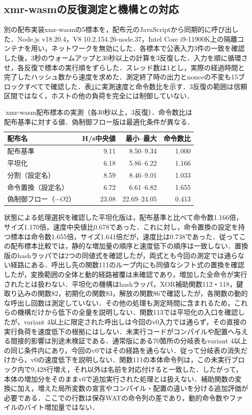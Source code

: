 \documentclass[submit,techrep]{ipsj}
\begin{document}
\subsection{xmr-wasmの反復測定と機構との対応}
\label{sec:xmr-runtime}
別の配布実装xmr-wasmの5標本を，配布元のJavaScriptから同期的に呼び出した．Node.js v18.20.4，V8 10.2.154.26-node.37，Intel Core i9-11900K上の隔離コンテナを用い，ネットワークを無効にした．各標本で公表入力3件の一致を確認した後，3秒のウォームアップと30秒以上の計算を3反復した．入力を順に循環させ，各反復で標本の実行順をずらした．スレッド数は1とし，実際の経過時間と完了したハッシュ数から速度を求めた．測定終了時の出力とnonceの不変も15ブロックすべてで確認した．表\ref{tab:xmr-runtime}に実測速度と命令数比を示す．3反復の範囲は信頼区間ではなく，ホストの他の負荷を完全には制御していない．
\begin{table}[t]
\centering\small
\caption{xmr-wasm配布標本の実測（各30秒以上，3反復）．命令数比は配布基準に対する値．偽制御フロー版は最適化条件が異なる．}
\label{tab:xmr-runtime}
\setlength{\tabcolsep}{3pt}
\begin{tabular}{lrrr}
\hline
配布名 & H/s中央値 & 最小--最大 & 命令数比 \\
\hline
配布基準 & 9.11 & 8.50--9.34 & 1.000 \\
平坦化 & 6.18 & 5.86--6.22 & 1.166 \\
分割（設定名） & 8.59 & 8.46--9.01 & 1.033 \\
命令置換（設定名） & 6.72 & 6.61--6.82 & 1.655 \\
偽制御フロー（$-O2$） & 23.08 & 22.69--24.05 & 0.413 \\
\hline
\end{tabular}
\end{table}

状態による処理選択を確認した平坦化版は，配布基準と比べて命令数1.166倍，サイズ1.170倍，速度中央値比0.678であった．これに対し，命令置換の設定を持つ標本は命令数1.655倍，サイズ1.641倍だが，速度比は0.738であった．従ってこの配布標本比較では，静的な増加量の順序と速度低下の順序は一致しない．置換版のhashラッパでは2つの同値式を確認したが，両式とも今回の測定では通らない経路にある．呼出し先の関数111のループ内にも同値なシフト式の置換を確認したが，変換範囲の全体と動的経路被覆は未確認であり，増加した全命令が実行されたとは扱わない．平坦化の機構はhashラッパ，XOR補助関数112・118，鍵取り込みの関数82，初期化の関数83，解放の関数86で確認したが，各関数の動的な呼出し回数は測定していない．その他の処理も測定時間に含まれるため，これらの機構だけから低下の全量を説明しない．関数113では平坦化の入口を確認したが，variant 4以上に限定された呼出しは今回のv0入力では通らず，その直接の実行負荷を速度低下の根拠にはしない．未実行コードがコンパイルや配置へ与える間接的影響は別途未検証である．通常版にある70箇所の分岐表もvariant 4以上の同じ条件内にあり，今回のv0ではその経路を通らない．従って分岐表の消失だけから，v0の速度低下を説明しない．関数111の本体命令列は，この未実行ブロック内で9,428行増え，それ以外は名前を対応付けると一致した．したがって，本体の増加分をそのままv0で追加実行された処理とは扱えない．補助関数の変換に加え，増えた局所変数の宣言やコンパイル・配置の違いを分ける追加評価が必要である．ここでの行数は保存WATの命令列の差であり，動的命令数やファイルのバイト増加量ではない．
\end{document}
